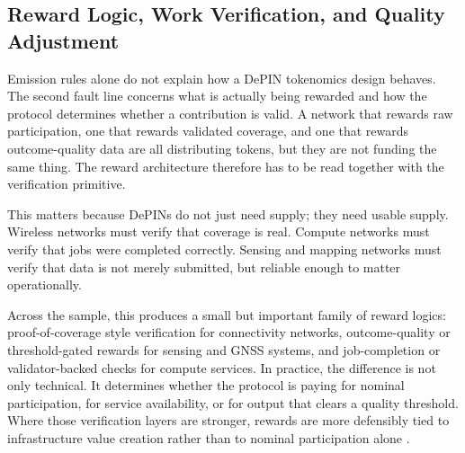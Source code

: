 \subsection{Reward Logic, Work Verification, and Quality Adjustment}
Emission rules alone do not explain how a DePIN tokenomics design behaves. The second fault line concerns what is actually being rewarded and how the protocol determines whether a contribution is valid. A network that rewards raw participation, one that rewards validated coverage, and one that rewards outcome-quality data are all distributing tokens, but they are not funding the same thing. The reward architecture therefore has to be read together with the verification primitive.

This matters because DePINs do not just need supply; they need usable supply. Wireless networks must verify that coverage is real. Compute networks must verify that jobs were completed correctly. Sensing and mapping networks must verify that data is not merely submitted, but reliable enough to matter operationally.

Across the sample, this produces a small but important family of reward logics: proof-of-coverage style verification for connectivity networks, outcome-quality or threshold-gated rewards for sensing and GNSS systems, and job-completion or validator-backed checks for compute services. In practice, the difference is not only technical. It determines whether the protocol is paying for nominal participation, for service availability, or for output that clears a quality threshold. Where those verification layers are stronger, rewards are more defensibly tied to infrastructure value creation rather than to nominal participation alone \cite{Ballandies2023, Chiu2024, Tan2020}.


